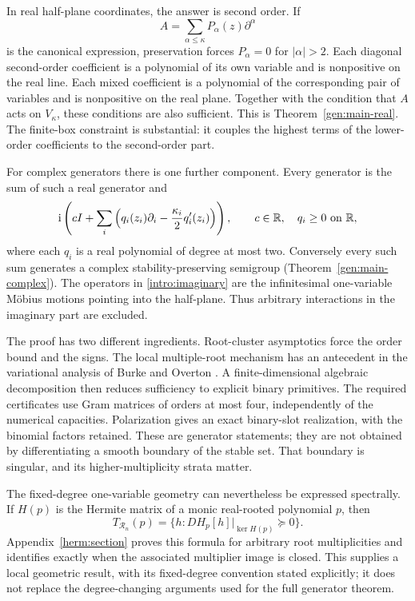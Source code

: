 \documentclass[reqno]{amsart}
\theoremstyle{definition}
\theoremstyle{remark}
\newcommand{\R}{\mathbb R}
\begin{document}
In real half-plane coordinates, the answer is second order. If
\[
 A=\sum_{\alpha\leq\kappa}P_\alpha(z)\partial^\alpha
\]
is the canonical expression, preservation forces $P_\alpha=0$ for
$|\alpha|>2$. Each diagonal second-order coefficient is a polynomial
of its own variable and is nonpositive on the real line. Each mixed
coefficient is a polynomial of the corresponding pair of variables and
is nonpositive on the real plane. Together with the condition that
$A$ acts on $V_\kappa$, these conditions are also sufficient.
This is Theorem~\ref{gen:main-real}. The finite-box constraint is
substantial: it couples the highest terms of the lower-order
coefficients to the second-order part.

For complex generators there is one further component.
Every generator is the sum of such a real generator and
\begin{equation}\label{intro:imaginary}
 \mathrm i\left(cI+\sum_i
   \left(q_i(z_i)\partial_i-\frac{\kappa_i}{2}q_i'(z_i)\right)\right),
 \qquad c\in\R,\quad q_i\geq0\ \hbox{on }\R,
\end{equation}
where each $q_i$ is a real polynomial of degree at most two.
Conversely every such sum generates a complex stability-preserving
semigroup (Theorem~\ref{gen:main-complex}).
The operators in \eqref{intro:imaginary} are the infinitesimal
one-variable M\"obius motions pointing into the half-plane.
Thus arbitrary interactions in the imaginary part are excluded.

The proof has two different ingredients. Root-cluster asymptotics force
the order bound and the signs. The local multiple-root mechanism has
an antecedent in the variational analysis of Burke and Overton
\cite[Theorem~1.2 and Lemma~1.4]{BurkeOverton01}.
A finite-dimensional algebraic
decomposition then reduces sufficiency to explicit binary primitives.
The required certificates use Gram matrices of orders at most four,
independently of the numerical capacities. Polarization gives an exact
binary-slot realization, with the binomial factors retained.
These are generator statements; they are not obtained by differentiating
a smooth boundary of the stable set. That boundary is singular, and its
higher-multiplicity strata matter.

The fixed-degree one-variable geometry can nevertheless be expressed
spectrally. If $H(p)$ is the Hermite matrix of a monic real-rooted
polynomial $p$, then
\[
 T_{\mathcal R_n}(p)
   =\{h:DH_p[h]|_{\ker H(p)}\succeq0\}.
\]
Appendix~\ref{herm:section} proves this formula for arbitrary root
multiplicities and identifies exactly when the associated multiplier
image is closed. This supplies a local geometric result, with its
fixed-degree convention stated explicitly; it does not replace the
degree-changing arguments used for the full generator theorem.
\end{document}
